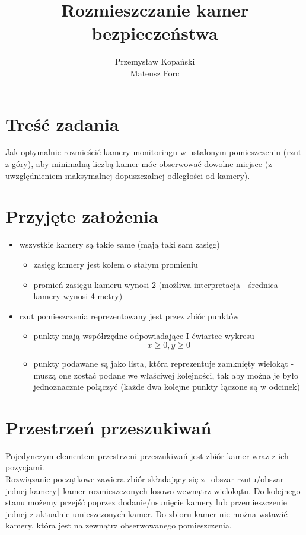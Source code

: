 \documentclass[12pt,a4paper]{article}
\title{Rozmieszczanie kamer bezpieczeństwa}
\author{Przemysław Kopański \\ Mateusz Forc}
\begin{document}
\maketitle
\tableofcontents

\newpage
\section{Treść zadania}
Jak optymalnie rozmieścić kamery monitoringu w ustalonym
pomieszczeniu (rzut z góry), aby minimalną liczbą kamer móc obserwować
dowolne miejsce (z uwzględnieniem maksymalnej dopuszczalnej odległości od kamery).
%
\section{Przyjęte założenia}
\begin{itemize}
\item wszystkie kamery są takie same (mają taki sam zasięg)
	\begin{itemize}
	\item zasięg kamery jest kołem o stałym promieniu
	\item promień zasięgu kameru wynosi 2 (możliwa interpretacja -
        średnica kamery wynosi 4 metry)
	\end{itemize}
\item rzut pomieszczenia reprezentowany jest przez zbiór punktów
	\begin{itemize}
	\item punkty mają współrzędne odpowiadające I ćwiartce wykresu
        \[x \geq 0, y \geq 0\]
	\item punkty podawane są jako lista, która reprezentuje zamknięty wielokąt -
        muszą one zostać podane we właściwej kolejności,
            tak aby można je było jednoznacznie połączyć
            (każde dwa kolejne punkty łączone są w odcinek)
	\end{itemize}
\end{itemize}
%
\section{Przestrzeń przeszukiwań}
Pojedynczym elementem przestrzeni przeszukiwań
jest zbiór kamer wraz z ich pozycjami. \\
Rozwiązanie początkowe zawiera zbiór składający się
z $\lceil$obszar rzutu/obszar jednej kamery$\rceil$ kamer
rozmieszczonych losowo wewnątrz wielokątu.
Do kolejnego stanu możemy przejść poprzez dodanie/usunięcie kamery lub
przemieszczenie jednej z aktualnie umieszczonych kamer.
Do zbioru kamer nie można wstawić kamery, która jest
na zewnątrz obserwowanego pomieszczenia.
%
\newpage
\end{document}
